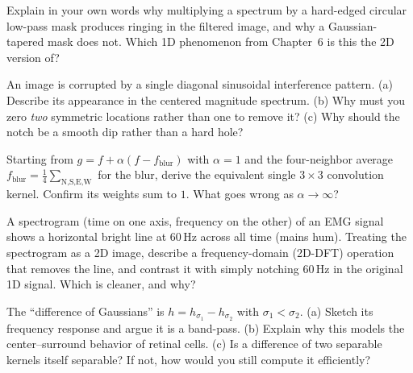 \begin{exercise}
\label{ch31:ex-ring}
Explain in your own words why multiplying a spectrum by a hard-edged circular
low-pass mask produces ringing in the filtered image, and why a Gaussian-tapered
mask does not. Which 1D phenomenon from Chapter~6 is this the
2D version of?
\end{exercise}

\begin{exercise}
\label{ch31:ex-notch2}
An image is corrupted by a single diagonal sinusoidal interference pattern. (a)
Describe its appearance in the centered magnitude spectrum. (b) Why must you zero
\emph{two} symmetric locations rather than one to remove it? (c) Why should the
notch be a smooth dip rather than a hard hole?
\end{exercise}

\begin{exercise}
\label{ch31:ex-unsharp}
Starting from $g = f + \alpha(f - f_{\text{blur}})$ with $\alpha=1$ and the
four-neighbor average $f_{\text{blur}} = \frac14\sum_{\text{N,S,E,W}}$ for the
blur, derive the equivalent single $3\times3$ convolution kernel. Confirm its
weights sum to $1$. What goes wrong as $\alpha\to\infty$?
\end{exercise}

\begin{exercise}
\label{ch31:ex-spectrogram}
A spectrogram (time on one axis, frequency on the other) of an EMG signal shows a
horizontal bright line at $60$\,Hz across all time (mains hum). Treating the
spectrogram as a 2D image, describe a frequency-domain (2D-DFT) operation that
removes the line, and contrast it with simply notching $60$\,Hz in the original 1D
signal. Which is cleaner, and why?
\end{exercise}

\begin{exercise}
\label{ch31:ex-dog}
The ``difference of Gaussians'' is $h = h_{\sigma_1} - h_{\sigma_2}$ with
$\sigma_1 < \sigma_2$. (a) Sketch its frequency response and argue it is a
band-pass. (b) Explain why this models the center--surround behavior of retinal
cells. (c) Is a difference of two separable kernels itself separable? If not, how
would you still compute it efficiently?
\end{exercise}
